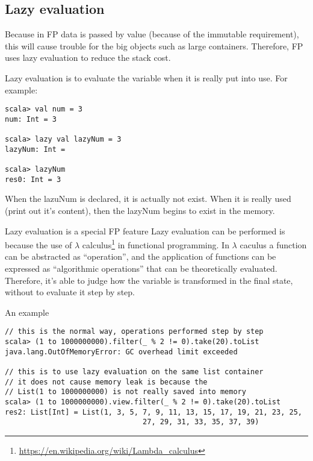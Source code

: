 \documentclass[notheorems, aspectratio=54]{beamer}
\begin{document}
\subsection{Lazy evaluation}
\begin{frame}[fragile]

Because in FP data is passed by value (because of the immutable requirement), this will cause trouble
for the big objects such as large containers. Therefore, FP uses lazy evaluation to reduce the stack cost.

Lazy evaluation is to evaluate the variable when it is really put into use. For example:
\begin{verbatim}
scala> val num = 3
num: Int = 3

scala> lazy val lazyNum = 3
lazyNum: Int = 

scala> lazyNum
res0: Int = 3
\end{verbatim}
When the lazuNum is declared, it is actually not exist. When it is really used (print out it's content), then
the lazyNum begins to exist in the memory.
  
\end{frame}

\begin{frame}[fragile]

\begin{block}{Lazy evaluation is a special FP feature}
Lazy evaluation can be performed is because the use of $\lambda$ calculus\footnote{
\url{https://en.wikipedia.org/wiki/Lambda_calculus}} in functional programming.  
In $\lambda$ caculus a function can be abstracted as ``operation'', and the application of functions
can be expressed as ``algorithmic operations'' that can be theoretically evaluated. Therefore, it's able 
to judge how the variable is transformed in the final state, without to evaluate it step by step.
\end{block}

\begin{block}{An example}
\begin{verbatim}
// this is the normal way, operations performed step by step
scala> (1 to 1000000000).filter(_ % 2 != 0).take(20).toList
java.lang.OutOfMemoryError: GC overhead limit exceeded

// this is to use lazy evaluation on the same list container
// it does not cause memory leak is because the 
// List(1 to 1000000000) is not really saved into memory
scala> (1 to 1000000000).view.filter(_ % 2 != 0).take(20).toList
res2: List[Int] = List(1, 3, 5, 7, 9, 11, 13, 15, 17, 19, 21, 23, 25, 
                                27, 29, 31, 33, 35, 37, 39)
\end{verbatim}
\end{block}


\end{frame}
\end{document}
